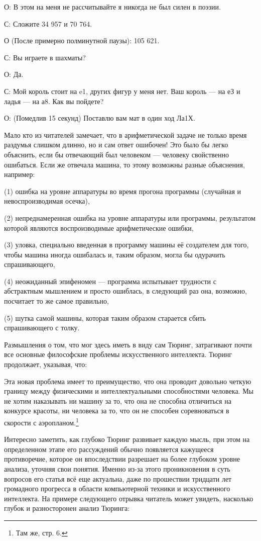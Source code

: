 \documentclass[../main.tex]{subfiles}
\begin{document}
О: В этом на меня не рассчитывайте я никогда не был силен в поэзии.

С: Сложите 34 957 и 70 764.

О (После примерно полминутной паузы): 105 621.

С: Вы играете в шахматы?

О: Да.

С: Мой король стоит на e1, других фигур у меня нет. Ваш король --- на еЗ и ладья --- на а8. Как вы пойдете?

О: (Помедлив 15 секунд) Поставлю вам мат в один ход Ла1Х.

Мало кто из читателей замечает, что в арифметической задаче не только время раздумья слишком длинно, но и сам ответ ошибочен! Это было бы легко объяснить, если бы отвечающий был человеком --- человеку свойственно ошибаться. Если же отвечала машина, то этому возможны разные объяснения, например:

(1) ошибка на уровне аппаратуры во время прогона программы (случайная и невоспроизводимая осечка),

(2) непреднамеренная ошибка на уровне аппаратуры или программы, результатом которой являются воспроизводимые арифметические ошибки,

(3) уловка, специально введенная в программу машины её создателем для того, чтобы машина иногда ошибалась и, таким образом, могла бы одурачить спрашивающего,

(4) неожиданный эпифеномен --- программа испытывает трудности с абстрактным мышлением и просто ошиблась, в следующий раз она, возможно, посчитает то же самое правильно,

(5) шутка самой машины, которая таким образом старается сбить спрашивающего с толку.

Размышления о том, что мог здесь иметь в виду сам Тюринг, затрагивают почти все основные философские проблемы искусственного интеллекта. Тюринг продолжает, указывая, что:

Эта новая проблема имеет то преимущество, что она проводит довольно четкую границу между физическими и интеллектуальными способностями человека. Мы не хотим наказывать ни машину за то, что она не способна отличиться на конкурсе красоты, ни человека за то, что он не способен соревноваться в скорости с аэропланом.\footnote{Там же, стр. 6.}

Интересно заметить, как глубоко Тюринг развивает каждую мысль, при этом на определенном этапе его рассуждений обычно появляется кажущееся противоречие, которое он впоследствии разрешает на более глубоком уровне анализа, уточняя свои понятия. Именно из-за этого проникновения в суть вопросов его статья всё еще актуальна, даже по прошествии тридцати лет громадного прогресса в области компьютерной техники и искусственного интеллекта. На примере следующего отрывка читатель может увидеть, насколько глубок и разносторонен анализ Тюринга:
\end{document}
